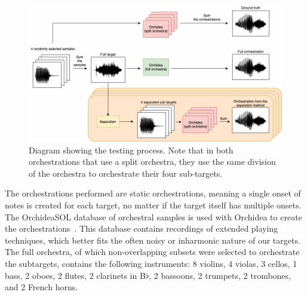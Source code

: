 \documentclass{article}
\begin{document}
    \begin{figure}[t]
      \centering
        \includegraphics[width=\textwidth]{figures/evaluation_diagram.png}
        \caption{Diagram showing the testing process. Note that in both orchestrations that use a split orchestra, they use the same division of the orchestra to orchestrate their four sub-targets.}\label{fig:eval_diagram}
    \end{figure}
    
    The orchestrations performed are static orchestrations, meaning a single onset of notes is created for each target, no matter if the target itself has multiple onsets. The OrchideaSOL database of orchestral samples is used with Orchidea to create the orchestrations~\cite{Cella2020c}. This database contains recordings of extended playing techniques, which better fits the often noisy or inharmonic nature of our targets. The full orchestra, of which non-overlapping subsets were selected to orchestrate the subtargets, contains the following instruments: 8 violins, 4 violas, 3 cellos, 1 bass, 2 oboes, 2 flutes, 2 clarinets in B$\flat$, 2 bassoons, 2 trumpets, 2 trombones, and 2 French horns.
    
\end{document}
